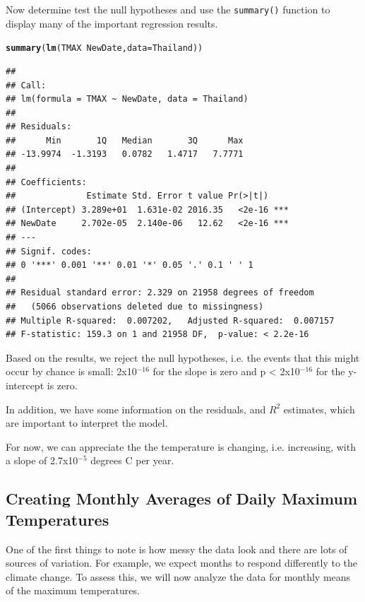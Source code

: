 \documentclass{article}\usepackage[]{graphicx}\usepackage[]{color}
\makeatletter
\newcommand{\hlopt}[1]{\textcolor[rgb]{0,0,0}{#1}}%
\newcommand{\hlstd}[1]{\textcolor[rgb]{0.345,0.345,0.345}{#1}}%
\newcommand{\hlkwc}[1]{\textcolor[rgb]{0.333,0.667,0.333}{#1}}%
\newcommand{\hlkwd}[1]{\textcolor[rgb]{0.737,0.353,0.396}{\textbf{#1}}}%
\newenvironment{kframe}{%
 \def\at@end@of@kframe{}%
 \ifinner\ifhmode%
  \def\at@end@of@kframe{\end{minipage}}%
  \begin{minipage}{\columnwidth}%
 \fi\fi%
 \def\FrameCommand##1{\hskip\@totalleftmargin \hskip-\fboxsep
 \colorbox{shadecolor}{##1}\hskip-\fboxsep
     \hskip-\linewidth \hskip-\@totalleftmargin \hskip\columnwidth}%
 \MakeFramed {\advance\hsize-\width
   \@totalleftmargin\z@ \linewidth\hsize
   \@setminipage}}%
 {\par\unskip\endMakeFramed%
 \at@end@of@kframe}
\newenvironment{knitrout}{}{} %
\makeatother
\begin{document}
Now determine test the null hypotheses and use the \texttt{summary()} function to display many of the important regression results.

\begin{knitrout}
\color{fgcolor}\begin{kframe}
\begin{alltt}
\hlkwd{summary}\hlstd{(}\hlkwd{lm}\hlstd{(TMAX} \hlopt{~} \hlstd{NewDate,} \hlkwc{data}\hlstd{=Thailand))}
\end{alltt}
\begin{verbatim}
## 
## Call:
## lm(formula = TMAX ~ NewDate, data = Thailand)
## 
## Residuals:
##      Min       1Q   Median       3Q      Max 
## -13.9974  -1.3193   0.0782   1.4717   7.7771 
## 
## Coefficients:
##              Estimate Std. Error t value Pr(>|t|)    
## (Intercept) 3.289e+01  1.631e-02 2016.35   <2e-16 ***
## NewDate     2.702e-05  2.140e-06   12.62   <2e-16 ***
## ---
## Signif. codes:  
## 0 '***' 0.001 '**' 0.01 '*' 0.05 '.' 0.1 ' ' 1
## 
## Residual standard error: 2.329 on 21958 degrees of freedom
##   (5066 observations deleted due to missingness)
## Multiple R-squared:  0.007202,	Adjusted R-squared:  0.007157 
## F-statistic: 159.3 on 1 and 21958 DF,  p-value: < 2.2e-16
\end{verbatim}
\end{kframe}
\end{knitrout}

Based on the results, we reject the null hypotheses, i.e. the events that this might occur by chance is small: 2x10$^{-16}$ for the slope is zero and p < 2x10$^{-16}$ for the y-intercept is zero. 

In addition, we have some information on the residuals, and $R^2$ estimates, which are important to interpret the model. 

For now, we can appreciate the the temperature is changing, i.e. increasing, with a slope of 2.7x10$^{-5}$ degrees C per year. 

\subsection{Creating Monthly Averages of Daily Maximum Temperatures}

One of the first things to note is how messy the data look and there are lots of sources of variation. For example, we expect months to respond differently to the climate change. To assess this, we will now analyze the data for monthly means of the maximum temperatures.
\end{document}
